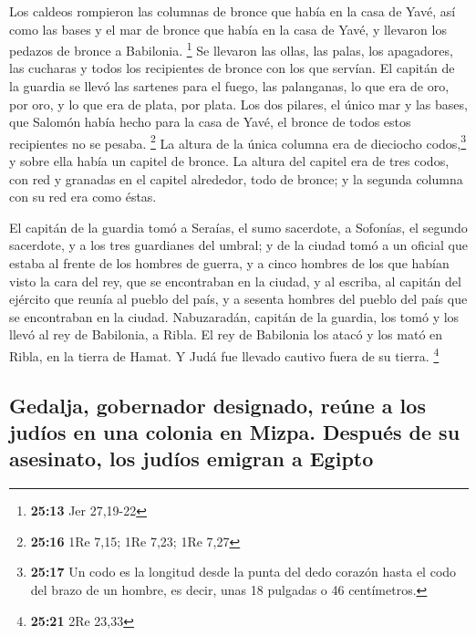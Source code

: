 \begin{paracol}{2}
 Los caldeos rompieron las columnas de bronce que había
en la casa de Yavé, así como las bases y el mar de bronce que había en
la casa de Yavé, y llevaron los pedazos de bronce a Babilonia.
\footnote{\textbf{25:13} Jer 27,19-22}  Se llevaron las
ollas, las palas, los apagadores, las cucharas y todos los recipientes
de bronce con los que servían.  El capitán de la guardia
se llevó las sartenes para el fuego, las palanganas, lo que era de oro,
por oro, y lo que era de plata, por plata.  Los dos
pilares, el único mar y las bases, que Salomón había hecho para la casa
de Yavé, el bronce de todos estos recipientes no se pesaba. \footnote{\textbf{25:16}
  1Re 7,15; 1Re 7,23; 1Re 7,27}  La altura de la única
columna era de dieciocho codos,\footnote{\textbf{25:17} Un codo es la
  longitud desde la punta del dedo corazón hasta el codo del brazo de un
  hombre, es decir, unas 18 pulgadas o 46 centímetros.} y sobre ella
había un capitel de bronce. La altura del capitel era de tres codos, con
red y granadas en el capitel alrededor, todo de bronce; y la segunda
columna con su red era como éstas.

 El capitán de la guardia tomó a Seraías, el sumo
sacerdote, a Sofonías, el segundo sacerdote, y a los tres guardianes del
umbral;  y de la ciudad tomó a un oficial que estaba al
frente de los hombres de guerra, y a cinco hombres de los que habían
visto la cara del rey, que se encontraban en la ciudad, y al escriba, al
capitán del ejército que reunía al pueblo del país, y a sesenta hombres
del pueblo del país que se encontraban en la ciudad. 
Nabuzaradán, capitán de la guardia, los tomó y los llevó al rey de
Babilonia, a Ribla.  El rey de Babilonia los atacó y los
mató en Ribla, en la tierra de Hamat. Y Judá fue llevado cautivo fuera
de su tierra. \footnote{\textbf{25:21} 2Re 23,33}

\hypertarget{gedalja-gobernador-designado-reuxfane-a-los-juduxedos-en-una-colonia-en-mizpa.-despuuxe9s-de-su-asesinato-los-juduxedos-emigran-a-egipto}{%
\subsection{Gedalja, gobernador designado, reúne a los judíos en una
colonia en Mizpa. Después de su asesinato, los judíos emigran a
Egipto}\label{gedalja-gobernador-designado-reuxfane-a-los-juduxedos-en-una-colonia-en-mizpa.-despuuxe9s-de-su-asesinato-los-juduxedos-emigran-a-egipto}}


\end{paracol}
